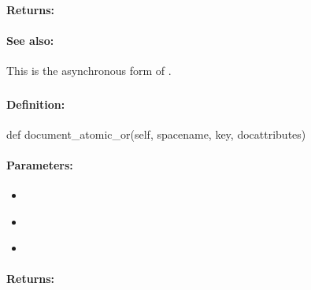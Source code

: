 \paragraph{Returns:}


\paragraph{See also:}  This is the asynchronous form of .

\pagebreak
\subsubsection{}
\label{api:python:document_atomic_or}


\paragraph{Definition:}
\begin{pythoncode}
def document_atomic_or(self, spacename, key, docattributes)
\end{pythoncode}

\paragraph{Parameters:}
\begin{itemize}[noitemsep]
\item {}\\

\item {}\\

\item {}\\

\end{itemize}

\paragraph{Returns:}


\pagebreak
\subsubsection{}
\label{api:python:async_document_atomic_or}



